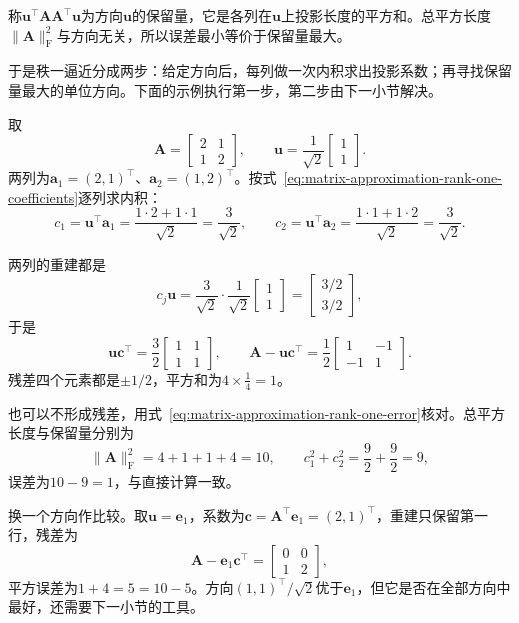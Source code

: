 称$\bm u^\top\bm A\bm A^\top\bm u$为方向$\bm u$的保留量，它是各列在$\bm u$上投影长度的平方和。总平方长度$\lVert\bm A\rVert_{\mathrm F}^2$与方向无关，所以误差最小等价于保留量最大。

于是秩一逼近分成两步：给定方向后，每列做一次内积求出投影系数；再寻找保留量最大的单位方向。下面的示例执行第一步，第二步由下一小节解决。

\begin{example}[固定方向时的秩一重建]
\label{ex:matrix-approximation-rank-one-fixed-direction}
取
\[
 \bm A=\begin{bmatrix}2&1\\1&2\end{bmatrix},\qquad
 \bm u=\frac1{\sqrt2}\begin{bmatrix}1\\1\end{bmatrix}.
\]
两列为$\bm a_1=(2,1)^\top$、$\bm a_2=(1,2)^\top$。按式~\eqref{eq:matrix-approximation-rank-one-coefficients}逐列求内积：
\[
 c_1=\bm u^\top\bm a_1=\frac{1\cdot2+1\cdot1}{\sqrt2}=\frac3{\sqrt2},\qquad
 c_2=\bm u^\top\bm a_2=\frac{1\cdot1+1\cdot2}{\sqrt2}=\frac3{\sqrt2}.
\]

两列的重建都是
\[
 c_j\bm u=\frac3{\sqrt2}\cdot\frac1{\sqrt2}\begin{bmatrix}1\\1\end{bmatrix}=\begin{bmatrix}3/2\\3/2\end{bmatrix},
\]
于是
\[
 \bm u\bm c^\top=\frac32\begin{bmatrix}1&1\\1&1\end{bmatrix},\qquad
 \bm A-\bm u\bm c^\top=\frac12\begin{bmatrix}1&-1\\-1&1\end{bmatrix}.
\]
残差四个元素都是$\pm1/2$，平方和为$4\times\tfrac14=1$。

也可以不形成残差，用式~\eqref{eq:matrix-approximation-rank-one-error}核对。总平方长度与保留量分别为
\[
 \lVert\bm A\rVert_{\mathrm F}^2=4+1+1+4=10,\qquad c_1^2+c_2^2=\frac92+\frac92=9,
\]
误差为$10-9=1$，与直接计算一致。

换一个方向作比较。取$\bm u=\bm e_1$，系数为$\bm c=\bm A^\top\bm e_1=(2,1)^\top$，重建只保留第一行，残差为
\[
 \bm A-\bm e_1\bm c^\top=\begin{bmatrix}0&0\\1&2\end{bmatrix},
\]
平方误差为$1+4=5=10-5$。方向$(1,1)^\top/\sqrt2$优于$\bm e_1$，但它是否在全部方向中最好，还需要下一小节的工具。
\end{example}

